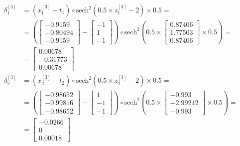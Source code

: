 \documentclass[12pt]{article}
\begin{document}
\begin{enumerate}[leftmargin=\labelsep]
        \begingroup
        \allowdisplaybreaks
          \begin{align*}
            \delta^{[3]}_1 &= \left(x^{[3]}_1 - t_1\right) \circ  \text{sech}^{2}\left(0.5\times z^{[3]}_1 - 2\right) \times 0.5 =  \\
            &=  \left(\begin{bmatrix} -0.9159 \\ -0.80494 \\ -0.9159\end{bmatrix} - \begin{bmatrix} -1 \\ 1 \\ -1 \end{bmatrix}\right) \circ \text{sech}^{2}\left(0.5\times \begin{bmatrix} 0.87406 \\ 1.77503 \\ 0.87406\end{bmatrix} \times 0.5\right) = \\
            &= \begin{bmatrix} 0.00678 \\ -0.31773 \\ 0.00678 \end{bmatrix} \\
            \delta^{[3]}_2 &= \left(x^{[3]}_2 - t_2\right) \circ  \text{sech}^{2}\left(0.5\times z^{[3]}_2 - 2\right) \times 0.5 =  \\
            &=  \left(\begin{bmatrix} -0.98652 \\ -0.99816 \\ -0.98652\end{bmatrix} - \begin{bmatrix} 1 \\ -1 \\ -1\end{bmatrix}\right) \circ \text{sech}^{2}\left(0.5\times \begin{bmatrix} -0.993 \\ -2.99212 \\ -0.993\end{bmatrix} \times 0.5\right) = \\
            &= \begin{bmatrix} -0.0266 \\ 0 \\ 0.00018 \end{bmatrix}
          \end{align*}
        \endgroup


\end{enumerate}
\end{document}

